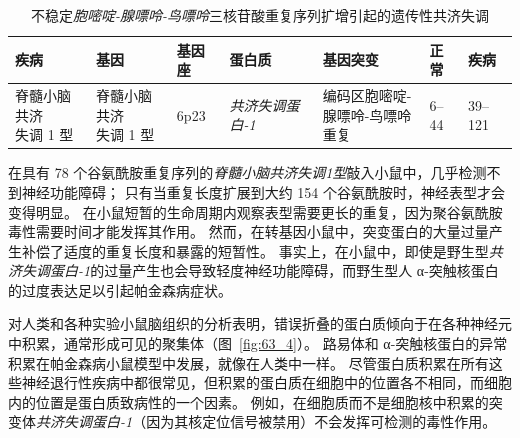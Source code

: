 \begin{table}[htbp]
	\caption{不稳定\textit{胞嘧啶-腺嘌呤-鸟嘌呤}三核苷酸重复序列扩增引起的遗传性共济失调} \label{tab:63_2} \centering
	\begin{tabular}{lllllll}
		\toprule
		疾病 & 基因 & 基因座 & 蛋白质 & 基因突变 & 正常 & 疾病 \\
		\midrule
		\makecell{脊髓小脑共济\\失调 1 型} & \makecell{脊髓小脑共济\\失调 1 型} & 6p23 & \textit{共济失调蛋白-1}   & \makecell{编码区胞嘧啶-\\腺嘌呤-鸟嘌呤重复} & 6–44 & 39–121 \\
		\bottomrule
	\end{tabular}
\end{table}


在具有 78 个谷氨酰胺重复序列的\textit{脊髓小脑共济失调1型}敲入小鼠中，几乎检测不到神经功能障碍；
只有当重复长度扩展到大约 154 个谷氨酰胺时，神经表型才会变得明显。
在小鼠短暂的生命周期内观察表型需要更长的重复，因为聚谷氨酰胺毒性需要时间才能发挥其作用。
然而，在转基因小鼠中，突变蛋白的大量过量产生补偿了适度的重复长度和暴露的短暂性。
事实上，在小鼠中，即使是野生型\textit{共济失调蛋白-1}的过量产生也会导致轻度神经功能障碍，而野生型人 α-突触核蛋白的过度表达足以引起帕金森病症状。


对人类和各种实验小鼠脑组织的分析表明，错误折叠的蛋白质倾向于在各种神经元中积累，通常形成可见的聚集体（图~\ref{fig:63_4}）。
路易体和 α-突触核蛋白的异常积累在帕金森病小鼠模型中发展，就像在人类中一样。
尽管蛋白质积累在所有这些神经退行性疾病中都很常见，但积累的蛋白质在细胞中的位置各不相同，而细胞内的位置是蛋白质致病性的一个因素。
例如，在细胞质而不是细胞核中积累的突变体\textit{共济失调蛋白-1}（因为其核定位信号被禁用）不会发挥可检测的毒性作用。


